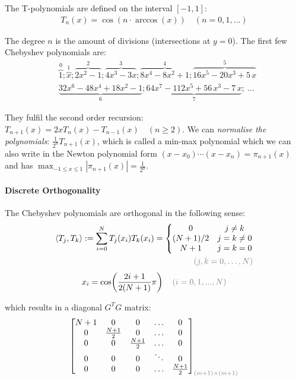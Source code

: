 The T-polynomials are defined on the interval $[-1,1]$:
\begin{align*}
    T_n(x)=\cos(n\cdot \arccos(x))\quad (n=0,1,\ldots)
\end{align*}

The degree $n$ is the amount of divisions (intersections at $y=0$).
The first few Chebyshev polynomials are:
\begin{align*}
    & \overbrace{1}^{0};\overbrace{x}^{1};\overbrace{2x^2-1}^{2};\overbrace{4x^3-3x}^{3};\overbrace{8x^4 - 8x^2 + 1}^{4};
    \overbrace{16x^{5}-20x^{3}+5\,x}^{5} \\
    & \underbrace{32x^{6}-48x^{4}+18x^{2}-1}_{6};\underbrace{64x^{7}-112x^{5}+56\,x^{3}-7\,x}_{7};\ \ldots
\end{align*}

They fulfil the second order recursion:
\colorbox{shadecolor}{$T_{n+1}(x)=2xT_n(x)-T_{n-1}(x)\quad(n\geq 2)$}.
We can \emph{normalise the polynomials}: $\frac{1}{2^n}T_{n+1}(x)$,
which is called a min-max polynomial which we can also write in the Newton polynomial form $(x-x_0)\cdots(x-x_n)=\pi_{n+1}(x)$
and has $\max_{-1\leq x \leq 1}|\pi_{n+1}(x)|=\frac{1}{2^n}$.

\paragraph{Discrete Orthogonality}

The Chebyshev polynomials are orthogonal in the following sense:
\begin{align*}
    \langle T_{j},T_{k}\rangle := \sum_{i=0}^{N}T_{j}(x_{i})T_{k}(x_{i})
    =
    \left\{
    \begin{matrix}
        0       & j \neq k \\
        (N+1)/2 & j = k \neq 0 \\
        N+1     & j=k=0
    \end{matrix}
    \right. \\
    {\color{gray} (j,k=0,\ldots,N)}
\end{align*}
\begin{align*}
    x_{i}=\cos\!\left({\frac{2i+1}{2(N+1)}}\pi\right)\quad{\color{gray} (i=0,1,...,N)}
\end{align*}

which results in a diagonal $G^TG$ matrix:
\begin{align*}
    \begin{bmatrix}
        N+1 & 0             & 0             & \ldots & 0             \\
        0   & \frac{N+1}{2} & 0             & \ldots & 0             \\
        0   & 0             & \frac{N+1}{2} & \ldots & 0             \\
        0   & 0             & 0             & \ddots & 0             \\
        0   & 0             & 0             & \ldots & \frac{N+1}{2}
    \end{bmatrix}_{\color{gray}(m+1)\times(m+1)}
\end{align*}

